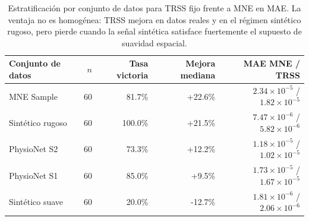 \begin{table}[htbp]
\centering
\small
\caption{Estratificación por conjunto de datos para TRSS fijo frente a MNE en MAE. La ventaja no es homogénea: TRSS mejora en datos reales y en el régimen sintético rugoso, pero pierde cuando la señal sintética satisface fuertemente el supuesto de suavidad espacial.}
\label{tab:ch6_by_dataset_mae}
\begin{tabular}{@{}lrrrr@{}}
\toprule
Conjunto de datos & $n$ & Tasa victoria & Mejora mediana & MAE MNE / TRSS \\
\midrule
MNE Sample & 60 & 81.7\% & +22.6\% & $2.34\times 10^{-5}$ / $1.82\times 10^{-5}$ \\
Sintético rugoso & 60 & 100.0\% & +21.5\% & $7.47\times 10^{-6}$ / $5.82\times 10^{-6}$ \\
PhysioNet S2 & 60 & 73.3\% & +12.2\% & $1.18\times 10^{-5}$ / $1.02\times 10^{-5}$ \\
PhysioNet S1 & 60 & 85.0\% & +9.5\% & $1.73\times 10^{-5}$ / $1.67\times 10^{-5}$ \\
Sintético suave & 60 & 20.0\% & -12.7\% & $1.81\times 10^{-6}$ / $2.06\times 10^{-6}$ \\
\bottomrule
\end{tabular}
\end{table}
